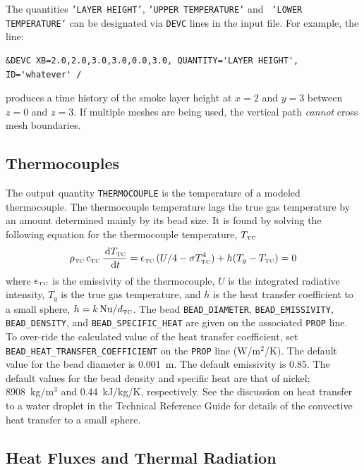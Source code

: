 \documentclass[11pt]{book}
\newcommand{\ct}{\tt\small}
\renewcommand{\d}{\,\mathrm{d}}
\newcommand{\be}{\begin{equation}}
\newcommand{\ee}{\end{equation}}
\newcommand{\NU}{\hbox{Nu}}
\begin{document}
The quantities {\ct 'LAYER HEIGHT'}, {\ct 'UPPER TEMPERATURE'} and {\ct
'LOWER TEMPERATURE'} can be designated via {\ct DEVC} lines
in the input file. For example, the line:

\footnotesize
\begin{verbatim}
&DEVC XB=2.0,2.0,3.0,3.0,0.0,3.0, QUANTITY='LAYER HEIGHT', ID='whatever' /
\end{verbatim}
\normalsize

\noindent
produces a time history of the smoke layer height at $x=2$ and $y=3$ between $z=0$ and $z=3$.
If multiple meshes are being used, the vertical path {\em cannot} cross mesh boundaries.



\subsection{Thermocouples}
\label{info:THERMOCOUPLE}

The output quantity {\ct THERMOCOUPLE} is the temperature of a modeled thermocouple. The thermocouple temperature lags the true gas temperature by an amount determined mainly
by its bead size. It is found by solving the following equation for the thermocouple temperature, $T_{\hbox{\tiny TC}}$~\cite{Welsh:1}
\be
   \rho_{\hbox{\tiny TC}} \, c_{\hbox{\tiny TC}} \, \frac{\d T_{\hbox{\tiny TC}}}{\d t} = \epsilon_{\hbox{\tiny TC}} \, (U/4 - \sigma T_{\hbox{\tiny TC}}^4) + h(T_g - T_{\hbox{\tiny TC}}) = 0
   \label{TC}
\ee
where $\epsilon_{\hbox{\tiny TC}}$ is the emissivity of the thermocouple, $U$ is the integrated radiative intensity, $T_g$ is the true gas temperature, and
$h$ is the heat transfer coefficient to a small sphere,
$h=k \, \NU / d_{\hbox{\tiny TC}}$.
The bead {\ct BEAD\_DIAMETER}, {\ct BEAD\_EMISSIVITY}, {\ct BEAD\_DENSITY}, and {\ct BEAD\_SPECIFIC\_HEAT} are given on the associated {\ct PROP} line. To over-ride the
calculated value of the heat transfer coefficient, set {\ct BEAD\_HEAT\_TRANSFER\_COEFFICIENT} on the {\ct PROP} line (W/m$^2$/K).
The default value for the bead diameter is 0.001~m. The default emissivity is 0.85. The default values for the bead density and specific heat are that of nickel; 8908~kg/m$^3$ and
0.44~kJ/kg/K, respectively.
See the discussion on heat transfer to a water
droplet in the Technical Reference Guide for details of the convective
heat transfer to a small sphere.


\subsection{Heat Fluxes and Thermal Radiation}
\label{info:heat_flux}
\end{document}
